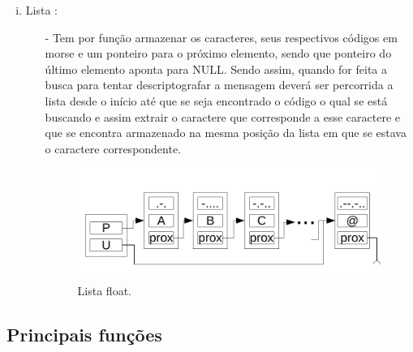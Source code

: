\documentclass[12 pt, a4paper]{article}
\begin{document}
\begin{enumerate}[(i)]
	\item Lista :
	\begin{itemize}
	   \item[-] Tem por fun\c{c}\~ao armazenar os caracteres, seus respectivos c\'odigos em morse e um ponteiro para o pr\'oximo elemento, sendo que ponteiro do \'ultimo elemento aponta para NULL. 
       \newline
       Sendo assim, quando for feita a busca para tentar descriptografar a mensagem dever\'a ser percorrida a lista desde o in\'icio at\'e que se seja encontrado o c\'odigo o qual se est\'a  buscando e assim extrair o caractere que corresponde a esse caractere e que se encontra armazenado na mesma posi\c{c}\~ao da lista em que se estava o caractere correspondente.\\

        \begin{figure}[H]
        \centering
        \includegraphics[scale = 0.52]{images/lista}
        \caption{Lista float.}
        \label{lista}
        \end{figure}
    \end{itemize}
\end{enumerate}

\subsection{Principais fun\c{c}\~oes}
\end{document}
